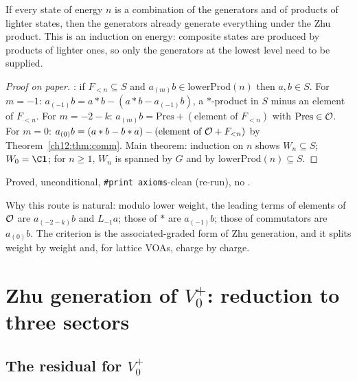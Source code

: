 \begin{physics}
If every state of energy $n$ is a combination of the generators and of products of lighter states, then the generators already generate everything under the Zhu product. This is an induction on energy: composite states are produced by products of lighter ones, so only the generators at the lowest level need to be supplied.
\end{physics}
\begin{proof}[Proof on paper]
: if $F_{<n}\subseteq S$ and $a_{(m)}b\in\mathrm{lowerProd}(n)$ then $a,b\in S$.
For $m=-1$: $a_{(-1)}b = a\ast b - (a\ast b-a_{(-1)}b)$, a $\ast$-product in $S$ minus an element of
$F_{<n}$.  For $m=-2-k$: $a_{(m)}b = \mathrm{Pres}+(\text{element of }F_{<n})$ with $\mathrm{Pres}\in\mathcal{O}$.
For $m=0$: $a_{(0)}b = (a\ast b-b\ast a) - (\text{element of }\mathcal{O}+F_{<n})$ by
Theorem~\ref{ch12:thm:comm}.  Main theorem: induction on $n$ shows $W_n\subseteq S$; $W_0=\C\mathbf 1$;
for $n\ge1$, $W_n$ is spanned by $G$ and by $\mathrm{lowerProd}(n)\subseteq S$.
\end{proof}
\begin{status}Proved, unconditional, \texttt{\#print axioms}-clean (re-run), no .\end{status}

\begin{remark}
Why this route is natural: modulo lower weight, the leading terms of elements of $\mathcal{O}$ are
$a_{(-2-k)}b$ and $L_{-1}a$; those of $\ast$ are $a_{(-1)}b$; those of commutators are $a_{(0)}b$.
The criterion is the associated-graded form of Zhu generation, and it splits weight by weight and,
for lattice VOAs, charge by charge.
\end{remark}

\section{Zhu generation of \texorpdfstring{$V_0^+$}{V₀⁺}: reduction to three sectors}\label{ch12:sec:sectorsplit}

\subsection{The residual for \texorpdfstring{$V_0^+$}{V₀⁺}}

